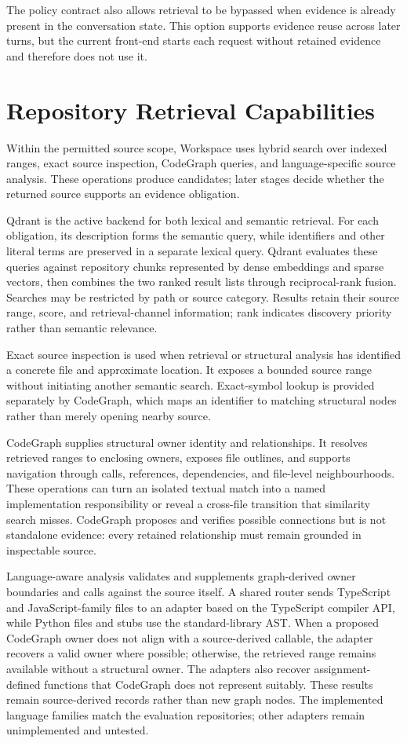 The policy contract also allows retrieval to be bypassed when evidence is already present in the conversation state. This option supports evidence reuse across later turns, but the current front-end starts each request without retained evidence and therefore does not use it.

\section{Repository Retrieval Capabilities}\label{sec:repository-retrieval-capabilities}

Within the permitted source scope, Workspace uses hybrid search over indexed ranges, exact source inspection, CodeGraph queries, and language-specific source analysis. These operations produce candidates; later stages decide whether the returned source supports an evidence obligation.

Qdrant is the active backend for both lexical and semantic retrieval. For each obligation, its description forms the semantic query, while identifiers and other literal terms are preserved in a separate lexical query. Qdrant evaluates these queries against repository chunks represented by dense embeddings and sparse vectors, then combines the two ranked result lists through reciprocal-rank fusion. Searches may be restricted by path or source category. Results retain their source range, score, and retrieval-channel information; rank indicates discovery priority rather than semantic relevance.

Exact source inspection is used when retrieval or structural analysis has identified a concrete file and approximate location. It exposes a bounded source range without initiating another semantic search. Exact-symbol lookup is provided separately by CodeGraph, which maps an identifier to matching structural nodes rather than merely opening nearby source.

CodeGraph supplies structural owner identity and relationships. It resolves retrieved ranges to enclosing owners, exposes file outlines, and supports navigation through calls, references, dependencies, and file-level neighbourhoods. These operations can turn an isolated textual match into a named implementation responsibility or reveal a cross-file transition that similarity search misses. CodeGraph proposes and verifies possible connections but is not standalone evidence: every retained relationship must remain grounded in inspectable source.

Language-aware analysis validates and supplements graph-derived owner boundaries and calls against the source itself. A shared router sends TypeScript and JavaScript-family files to an adapter based on the TypeScript compiler API, while Python files and stubs use the standard-library AST. When a proposed CodeGraph owner does not align with a source-derived callable, the adapter recovers a valid owner where possible; otherwise, the retrieved range remains available without a structural owner. The adapters also recover assignment-defined functions that CodeGraph does not represent suitably. These results remain source-derived records rather than new graph nodes. The implemented language families match the evaluation repositories; other adapters remain unimplemented and untested.


